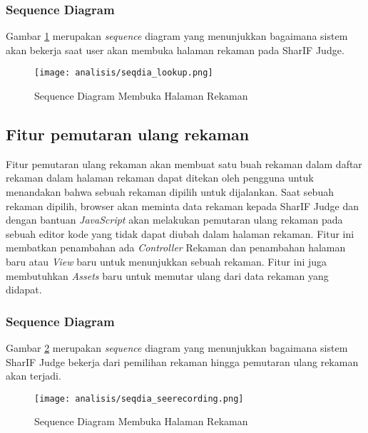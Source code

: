 \subsubsection{Sequence Diagram}
Gambar \ref{fig:3:2:seqdia_lookup} merupakan \textit{sequence} diagram yang menunjukkan bagaimana sistem akan bekerja saat user akan membuka halaman rekaman pada SharIF Judge.
\begin{figure}
	\centering
	\texttt{[image: analisis/seqdia\_lookup.png]}
	\caption{Sequence Diagram Membuka Halaman Rekaman}
	\label{fig:3:2:seqdia_lookup}
\end{figure}

\subsection{Fitur pemutaran ulang rekaman}
\label{sub:3:2:seerecording}

Fitur pemutaran ulang rekaman akan membuat satu buah rekaman dalam daftar rekaman dalam halaman rekaman dapat ditekan oleh pengguna untuk menandakan bahwa sebuah rekaman dipilih untuk dijalankan. Saat sebuah rekaman dipilih, browser akan meminta data rekaman kepada SharIF Judge dan dengan bantuan \textit{JavaScript} akan melakukan pemutaran ulang rekaman pada sebuah editor kode yang tidak dapat diubah dalam halaman rekaman. Fitur ini membatkan penambahan ada \textit{Controller} Rekaman dan penambahan halaman baru atau \textit{View} baru untuk menunjukkan sebuah rekaman. Fitur ini juga membutuhkan \textit{Assets} baru untuk memutar ulang dari data rekaman yang didapat.

\subsubsection{Sequence Diagram}
Gambar \ref{fig:3:2:seqdia_seerecording} merupakan \textit{sequence} diagram yang menunjukkan bagaimana sistem SharIF Judge bekerja dari pemilihan rekaman hingga pemutaran ulang rekaman akan terjadi.
\begin{figure}[H]
	\centering
	\texttt{[image: analisis/seqdia\_seerecording.png]}
	\caption{Sequence Diagram Membuka Halaman Rekaman}
	\label{fig:3:2:seqdia_seerecording}
\end{figure}